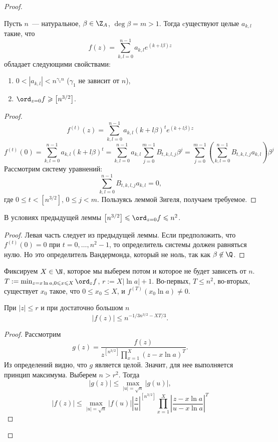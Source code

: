 \begin{proof}
  \begin{lemma}
    Пусть $n$~--- натуральное, $\beta \in \Z_A$, $\deg \beta = m > 1$.
    Тогда cуществуют целые $a_{k,l}$ такие, что
    $$
      f(z) = \sum_{k,l=0}^{n-1} a_{k,l} e^{(k+l \beta)z}
    $$
    обладает следующими свойствами:
    \begin{enumerate}
      \item $0 < |a_{k,l}| < n^{\gamma_1 n}$ ($\gamma_1$ не зависит от $n$),
      \item $\ord_{z=0} f \geqslant \left[n^{3/2}\right]$.
    \end{enumerate}
  \end{lemma}
  \begin{proof}
    $$
      f^{(t)}(z) = \sum_{k,l=0}^{n-1} a_{k,l} (k + l \beta)^t e^{(k+l \beta)z}
    $$
    $$
      f^{(t)}(0) = \sum_{k,l=0}^{n-1} a_{k,l} (k + l \beta)^t = \sum_{k,l=0}^{n-1} a_{k,l} \sum_{j=0}^{m-1} B_{t,k,l,j} \beta^j =
      \sum_{j=0}^{m-1} \left( \sum_{k,l=0}^{n-1} B_{t,k,l,j} a_{k,l} \right) \beta^j
    $$
    Рассмотрим систему уравнений:
    $$
      \sum_{k,l=0}^{n-1} B_{t,k,l,j} a_{k,l} = 0,
    $$
    где $0 \leqslant t < \left[ n^{3/2} \right]$, $0 \leqslant j < m$. Пользуясь леммой Зигеля, получаем требуемое.
  \end{proof}
  
  \begin{lemma}
    В условиях предыдущей леммы $\left[ n^{3/2} \right] \leqslant \ord_{z=0} f \leqslant n^2$.
  \end{lemma}
  \begin{proof}
    Левая часть следует из предыдущей леммы.
    Если предположить, что $f^{(t)}(0) = 0$ при $t = 0, \ldots, n^2 - 1$, то определитель системы должен равняться нулю. Но это определитель Вандермонда, который не ноль, так как $\beta \not \in \Q$.
  \end{proof}
  
  Фиксируем $X \in \N$, которое мы выберем потом и которое не будет зависеть от $n$. $T := \min_{z = x \ln a, 0 \leqslant x \leqslant X} \ord_z f$, $r := X |\ln a| + 1$.
  Во-первых, $T \leqslant n^2$, во-вторых, существует $x_0$ такое, что $0 \leqslant x_0 \leqslant X$, и $f^{(T)} (x_0 \ln a) \ne 0$.
  
  \begin{lemma}
    При $|z| \leqslant r$ и при достаточно большом $n$
    $$
      |f(z)| \leqslant n^{-1/3 n^{3/2} - XT / 3}.
    $$
  \end{lemma}
  \begin{proof}
    Рассмотрим
    $$
      g(z) = \frac{f(z)}{z^{\left[ n^{3/2} \right]} \prod_{x=1}^X (z- x \ln a)^T}.
    $$
    Из определений видно, что $g$ является целой. Значит, для нее выполняется принцип максимума.
    Выберем $n > r^2$. Тогда
    $$
      |g(z)| \leqslant \max_{|u| = \sqrt{n}} |g(u)|,
    $$
    $$
      |f(z)| \leqslant \max_{|u| = \sqrt{n}} |f(u)| \left| \frac{z}{u} \right|^{\left[ n^{3/2} \right]} \prod_{x=1}^X \left| \frac{z - x \ln a}{u - x \ln a} \right|^T
    $$
    

\end{proof}
\end{proof}
